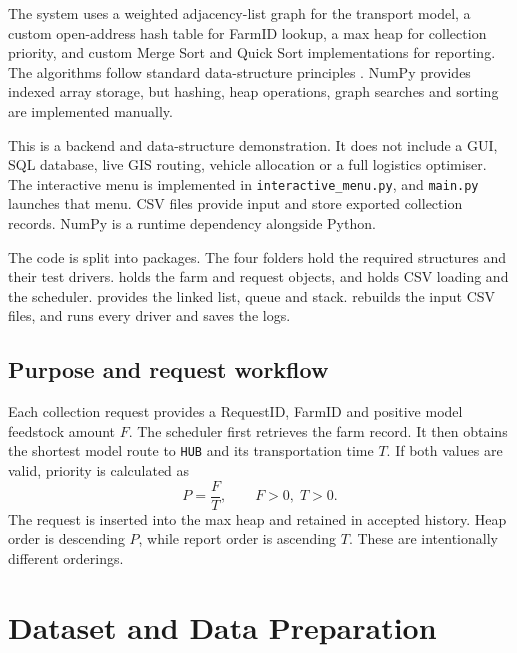\documentclass[10pt,a4paper]{article}
\begin{document}
The system uses a weighted adjacency-list graph for the transport model, a custom open-address hash table for FarmID lookup, a max heap for collection priority, and custom Merge Sort and Quick Sort implementations for reporting. The algorithms follow standard data-structure principles \cite{clrs2022}. NumPy provides indexed array storage, but hashing, heap operations, graph searches and sorting are implemented manually.

This is a backend and data-structure demonstration. It does not include a GUI, SQL database, live GIS routing, vehicle allocation or a full logistics optimiser. The interactive menu is implemented in \texttt{interactive\_menu.py}, and \texttt{main.py} launches that menu. CSV files provide input and store exported collection records. NumPy is a runtime dependency alongside Python.

The code is split into packages. The four  folders hold the required structures and their test drivers.  holds the farm and request objects, and  holds CSV loading and the scheduler.  provides the linked list, queue and stack.  rebuilds the input CSV files, and  runs every driver and saves the logs.

\subsection{Purpose and request workflow}

Each collection request provides a RequestID, FarmID and positive model feedstock amount $F$. The scheduler first retrieves the farm record. It then obtains the shortest model route to \texttt{HUB} and its transportation time $T$. If both values are valid, priority is calculated as
\begin{equation}
P=\frac{F}{T}, \qquad F>0,\;T>0.
\label{eq:priority}
\end{equation}
The request is inserted into the max heap and retained in accepted history. Heap order is descending $P$, while report order is ascending $T$. These are intentionally different orderings.

\section{Dataset and Data Preparation}
\label{sec:data}
\end{document}
